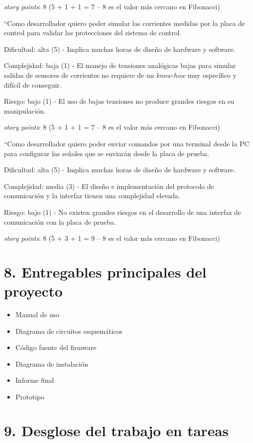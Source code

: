 \documentclass[
11pt, %
codirector, %
]{charter}
\begin{document}
\textit{story points}: 8
(5 + 1 + 1 = 7 -- 8 es el valor más cercano en Fibonacci)

``Como desarrollador quiero poder simular las corrientes medidas por la placa de control para validar las protecciones del sistema de control.

Dificultad: alta (5) - Implica muchas horas de diseño de hardware y software.

Complejidad: baja (1) - El manejo de tensiones analógicas bajas para simular salidas de sensores de corrientes no requiere de un \textit{know-how} muy específico y difícil de conseguir.

Riesgo: bajo (1) - El uso de bajas tensiones no produce grandes riesgos en su manipulación.

\textit{story points}: 8
(5 + 1 + 1 = 7 -- 8 es el valor más cercano en Fibonacci)

``Como desarrollador quiero poder enviar comandos por una terminal desde la PC para configurar las señales que se enviarán desde la placa de prueba.

Dificultad: alta (5) - Implica muchas horas de diseño de hardware y software.

Complejidad: media (3) - El diseño e implementación del protocolo de comunicación y la interfaz tienen una complejidad elevada.

Riesgo: bajo (1) - No existen grandes riesgos en el desarrollo de una interfaz de comunicación con la placa de prueba.

\textit{story points}: 8
(5 + 3 + 1 = 9 -- 8 es el valor más cercano en Fibonacci)

\section{8. Entregables principales del proyecto}
\label{sec:entregables}

\begin{itemize}
	\item Manual de uso
	\item Diagrama de circuitos esquemáticos
	\item Código fuente del firmware
	\item Diagrama de instalación
	\item Informe final
	\item Prototipo
\end{itemize}

\section{9. Desglose del trabajo en tareas}
\label{sec:wbs}
\end{document}
